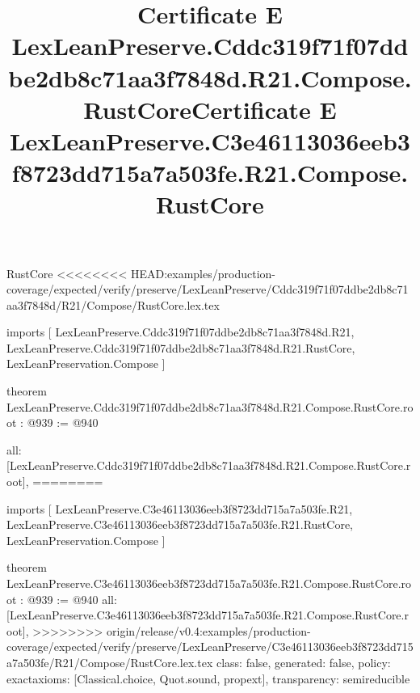 \begin{lexlean}{RustCore}
<<<<<<<< HEAD:examples/production-coverage/expected/verify/preserve/LexLeanPreserve/Cddc319f71f07ddbe2db8c71aa3f7848d/R21/Compose/RustCore.lex.tex
\title{Certificate E LexLeanPreserve.Cddc319f71f07ddbe2db8c71aa3f7848d.R21.Compose.RustCore}
\begin{coremodule}
imports [
  LexLeanPreserve.Cddc319f71f07ddbe2db8c71aa3f7848d.R21,
  LexLeanPreserve.Cddc319f71f07ddbe2db8c71aa3f7848d.R21.RustCore,
  LexLeanPreservation.Compose
]

theorem LexLeanPreserve.Cddc319f71f07ddbe2db8c71aa3f7848d.R21.Compose.RustCore.root : @939 := @940 {
  all: [LexLeanPreserve.Cddc319f71f07ddbe2db8c71aa3f7848d.R21.Compose.RustCore.root],
========
\title{Certificate E LexLeanPreserve.C3e46113036eeb3f8723dd715a7a503fe.R21.Compose.RustCore}
\begin{coremodule}
imports [
  LexLeanPreserve.C3e46113036eeb3f8723dd715a7a503fe.R21,
  LexLeanPreserve.C3e46113036eeb3f8723dd715a7a503fe.R21.RustCore,
  LexLeanPreservation.Compose
]

theorem LexLeanPreserve.C3e46113036eeb3f8723dd715a7a503fe.R21.Compose.RustCore.root : @939 := @940 {
  all: [LexLeanPreserve.C3e46113036eeb3f8723dd715a7a503fe.R21.Compose.RustCore.root],
>>>>>>>> origin/release/v0.4:examples/production-coverage/expected/verify/preserve/LexLeanPreserve/C3e46113036eeb3f8723dd715a7a503fe/R21/Compose/RustCore.lex.tex
  class: false,
  generated: false,
  policy: exact{axioms: [Classical.choice, Quot.sound, propext]},
  transparency: semireducible
}


\end{coremodule}}
\end{coremodule}
\end{lexlean}
